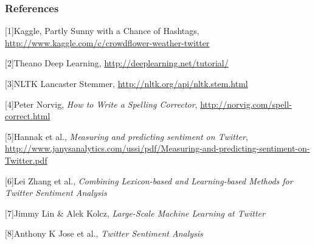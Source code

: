 \documentclass{article}
\begin{document}
\subsubsection*{References}

\small{
	[1]Kaggle, Partly Sunny with a Chance of Hashtags, \url{http://www.kaggle.com/c/crowdflower-weather-twitter}
	
	[2]Theano Deep Learning, \url{http://deeplearning.net/tutorial/}
	
	[3]NLTK Lancaster Stemmer, \url{http://nltk.org/api/nltk.stem.html}
	
	[4]Peter Norvig, {\it How to Write a Spelling Corrector}, \url{http://norvig.com/spell-correct.html}

	[5]Hannak et al., {\it Measuring and predicting sentiment on Twitter}, \url{http://www.janysanalytics.com/ussi/pdf/Measuring-and-predicting-sentiment-on-Twitter.pdf}

	[6]Lei Zhang et al., {\it Combining Lexicon-based and Learning-based Methods for Twitter Sentiment Analysis}

	[7]Jimmy Lin \& Alek Kolcz, {\it Large-Scale Machine Learning at Twitter}

	[8]Anthony K Jose et al., {\it Twitter Sentiment Analysis}
}
\end{document}
